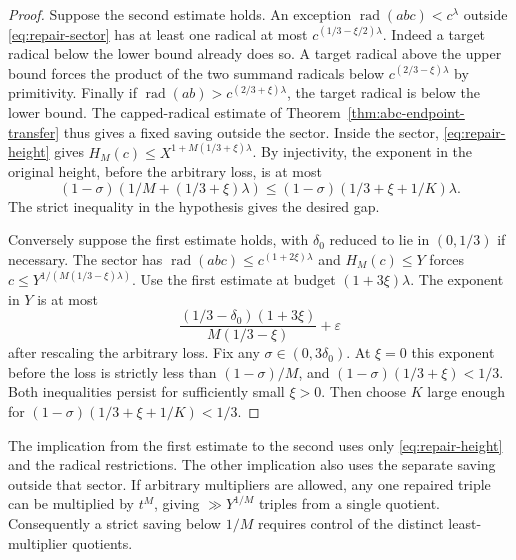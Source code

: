\documentclass[11pt,reqno]{amsart}
\DeclareMathOperator{\rad}{rad}
\newcommand{\eps}{\varepsilon}
\begin{document}
\begin{proof}
Suppose the second estimate holds. An exception
\(\rad(abc)<c^\lambda\) outside \eqref{eq:repair-sector}
has at least one radical at most \(c^{(1/3-\xi/2)\lambda}\).
Indeed a target radical below the lower bound already does so.
A target radical above the upper bound forces the product of the
two summand radicals below \(c^{(2/3-\xi)\lambda}\) by
primitivity. Finally if \(\rad(ab)>c^{(2/3+\xi)\lambda}\), the
target radical is below the lower bound. The capped-radical
estimate of Theorem~\ref{thm:abc-endpoint-transfer} thus gives
a fixed saving outside the sector. Inside the sector,
\eqref{eq:repair-height} gives \(H_M(c)\le X^{1+M(1/3+\xi)\lambda}\).
By injectivity, the exponent in the original height, before the
arbitrary loss, is at most
\[
 (1-\sigma)(1/M+(1/3+\xi)\lambda)
 \le(1-\sigma)(1/3+\xi+1/K)\lambda.
\]
The strict inequality in the hypothesis gives the desired gap.

Conversely suppose the first estimate holds, with
\(\delta_0\) reduced to lie in \((0,1/3)\) if necessary.
The sector has \(\rad(abc)\le c^{(1+2\xi)\lambda}\) and
\(H_M(c)\le Y\) forces
\(c\le Y^{1/(M(1/3-\xi)\lambda)}\).
Use the first estimate at budget \((1+3\xi)\lambda\).
The exponent in \(Y\) is at most
\[
 \frac{(1/3-\delta_0)(1+3\xi)}{M(1/3-\xi)}+\eps
\]
after rescaling the arbitrary loss. Fix any \(\sigma\in(0,3\delta_0)\).
At \(\xi=0\) this exponent before the loss is strictly less
than \((1-\sigma)/M\), and \((1-\sigma)(1/3+\xi)<1/3\).
Both inequalities persist for sufficiently small \(\xi>0\).
Then choose \(K\) large enough for
\((1-\sigma)(1/3+\xi+1/K)<1/3\).
\end{proof}

The implication from the first estimate to the second uses only
\eqref{eq:repair-height} and the radical restrictions. The other
implication also uses the separate saving outside that sector.
If arbitrary multipliers are allowed, any one repaired triple
can be multiplied by \(t^M\), giving \(\gg Y^{1/M}\) triples
from a single quotient. Consequently a strict saving below
\(1/M\) requires control of the distinct least-multiplier quotients.
\end{document}
